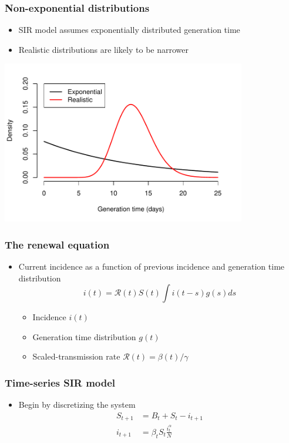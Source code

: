 \documentclass{beamer}
\begin{document}
\begin{frame}
\frametitle{Non-exponential distributions}
\begin{itemize}
	\item SIR model assumes exponentially distributed generation time
	\item Realistic distributions are likely to be narrower \citep{simpson1952infectiousness, cori2013new}
\end{itemize}
\begin{center}
\includegraphics[width=0.8\textwidth]{distribution.pdf}
\end{center}
\end{frame}

\begin{frame}
\frametitle{The renewal equation}
\begin{itemize}
	\item Current incidence as a function of previous incidence and generation time distribution
	$$
	i(t) = \mathcal R(t) S(t) \int i(t-s) g(s) ds
	$$
	\begin{itemize}
	\itemsep0.7em
	\item Incidence $i(t)$
	\item Generation time distribution $g(t)$
	\item Scaled-transmission rate $\mathcal R(t) = \beta(t)/\gamma$
	\end{itemize}
\end{itemize}
\end{frame}

\begin{frame}
\frametitle{Time-series SIR model}
\begin{itemize}
	\item Begin by discretizing the system
	$$
	\begin{aligned}
	S_{t+1} &= B_t + S_t - i_{t+1}\\
	i_{t+1} &= \beta_t S_t \frac{i_t^\alpha}{N} 
	\end{aligned}
	$$
\end{itemize}
\end{frame}
\end{document}
